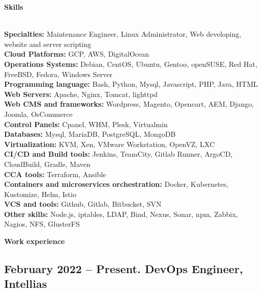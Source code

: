 \documentclass[letterpaper]{article}
\renewcommand{\section}[1]{
  {
    \large \colorbox{my-gray}{
      \begin{minipage}
        {\textwidth-0.175in}
        {\textbf{#1 \vphantom{p\^{E}}}}
      \end{minipage}
    }
  }
}
\begin{document}
\section{Skills}
\label{sec-1}\\
\label{sec-1-1}
\textbf{Specialties:} Maintenance Engineer, Linux Administrator, Web developing, website and server scripting\\
\label{sec-1-2}
\textbf{Cloud Platforms:} GCP, AWS, DigitalOcean\\
\label{sec-1-3}
\textbf{Operations Systems:} Debian, CentOS, Ubuntu, Gentoo, openSUSE, Red Hat, FreeBSD, Fedora, Windows Server\\
\label{sec-1-4}
\textbf{Programming language:} Bash, Python, Mysql, Javascript, PHP, Java, HTML\\
\label{sec-1-5}
\textbf{Web Servers:} Apache, Nginx, Tomcat, lighttpd\\
\label{sec-1-6}
\textbf{Web CMS and frameworks:} Wordpress, Magento, Opencart, AEM, Django, Joomla, OsCommerce\\
\label{sec-1-7}
\textbf{Control Panels:} Cpanel, WHM, Plesk, Virtualmin\\
\label{sec-1-8}
\textbf{Databases:} Mysql, MariaDB, PostgreSQL, MongoDB\\
\label{sec-1-10}
\textbf{Virtualization:} KVM, Xen, VMware Workstation, OpenVZ, LXC\\
\label{sec-1-11}
\textbf{CI/CD and Build tools:} Jenkins, TeamCity, Gitlab Runner, ArgoCD, CloudBuild, Gradle, Maven\\
\label{sec-1-12}
\textbf{CCA tools:} Terraform, Ansible\\
\label{sec-1-13}
\textbf{Containers and microservices orchestration:} Docker, Kubernetes, Kustomize, Helm, Istio\\
\label{sec-1-14}
\textbf{VCS and tools:} Github, Gitlab, Bitbucket, SVN\\
\label{sec-1-15}
\textbf{Other skills:}  Node.js, iptables, LDAP, Bind, Nexus, Sonar, npm, Zabbix, Nagios, NFS, GlusterFS\\
\section{Work experience}
\label{sec-2}

\subsection{{February 2022 – Present}. DevOps Engineer, Intellias}
\label{sec-2-1}
\end{document}

